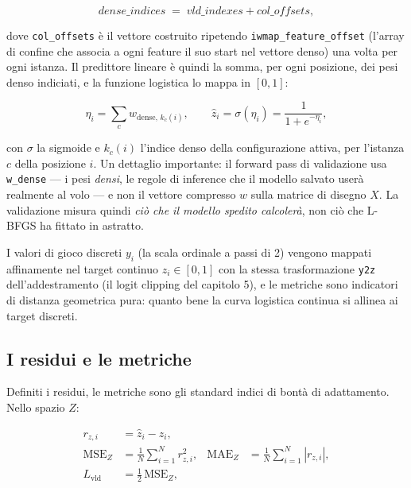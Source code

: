 \begin{equation}
  \mathit{dense\_indices} \;=\; \mathit{vld\_indexes} +
  \mathit{col\_offsets},
\end{equation}

dove \texttt{col\_offsets} è il vettore costruito ripetendo
\texttt{iwmap\_feature\_offset} (l'array di confine che associa a ogni
feature il suo start nel vettore denso) una volta per ogni istanza. Il
predittore lineare è quindi la somma, per ogni posizione, dei pesi denso
indiciati, e la funzione logistica lo mappa in $[0, 1]$:

\begin{equation}
  \eta_i = \sum_{c} w_{\mathrm{dense},\, k_c(i)},
  \qquad
  \hat{z}_i = \sigma(\eta_i) = \frac{1}{1 + e^{-\eta_i}},
\end{equation}

con $\sigma$ la sigmoide e $k_c(i)$ l'indice denso della configurazione
attiva, per l'istanza $c$ della posizione $i$. Un dettaglio importante: il
forward pass di validazione usa \texttt{w\_dense} — i pesi \emph{densi}, le
regole di inference che il modello salvato userà realmente al volo — e non il
vettore compresso $w$ sulla matrice di disegno $X$. La validazione misura
quindi \emph{ciò che il modello spedito calcolerà}, non ciò che L-BFGS ha
fittato in astratto.

I valori di gioco discreti $y_i$ (la scala ordinale a passi di 2) vengono
mappati affinamente nel target continuo $z_i \in [0, 1]$ con la stessa
trasformazione \texttt{y2z} dell'addestramento (il logit clipping del
capitolo 5), e le metriche sono indicatori di distanza geometrica pura:
quanto bene la curva logistica continua si allinea ai target discreti.

\subsection{I residui e le metriche}

Definiti i residui, le metriche sono gli standard indici di bontà di adattamento.
Nello spazio $Z$:

\begin{align}
  r_{z,i} &= \hat{z}_i - z_i, \\
  \mathrm{MSE}_{Z} &= \frac{1}{N} \sum_{i=1}^{N} r_{z,i}^{2},
  &
  \mathrm{MAE}_{Z} &= \frac{1}{N} \sum_{i=1}^{N} \left| r_{z,i} \right|, \\
  L_{\mathrm{vld}} &= \tfrac{1}{2}\, \mathrm{MSE}_{Z},
\end{align}

